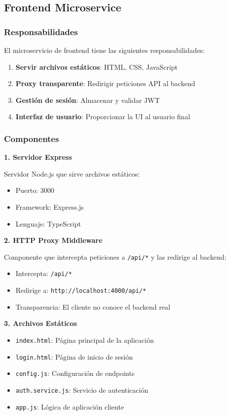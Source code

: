 \documentclass[12pt,a4paper]{article}
\begin{document}
\subsection{Frontend Microservice}

\subsubsection{Responsabilidades}

El microservicio de frontend tiene las siguientes responsabilidades:

\begin{enumerate}[leftmargin=*]
    \item \textbf{Servir archivos estáticos}: HTML, CSS, JavaScript
    \item \textbf{Proxy transparente}: Redirigir peticiones API al backend
    \item \textbf{Gestión de sesión}: Almacenar y validar JWT
    \item \textbf{Interfaz de usuario}: Proporcionar la UI al usuario final
\end{enumerate}

\subsubsection{Componentes}

\textbf{1. Servidor Express}

Servidor Node.js que sirve archivos estáticos:
\begin{itemize}
    \item Puerto: 3000
    \item Framework: Express.js
    \item Lenguaje: TypeScript
\end{itemize}

\textbf{2. HTTP Proxy Middleware}

Componente que intercepta peticiones a \texttt{/api/*} y las redirige al backend:
\begin{itemize}
    \item Intercepta: \texttt{/api/*}
    \item Redirige a: \texttt{http://localhost:4000/api/*}
    \item Transparencia: El cliente no conoce el backend real
\end{itemize}

\textbf{3. Archivos Estáticos}

\begin{itemize}
    \item \texttt{index.html}: Página principal de la aplicación
    \item \texttt{login.html}: Página de inicio de sesión
    \item \texttt{config.js}: Configuración de endpoints
    \item \texttt{auth.service.js}: Servicio de autenticación
    \item \texttt{app.js}: Lógica de aplicación cliente
\end{itemize}
\end{document}
